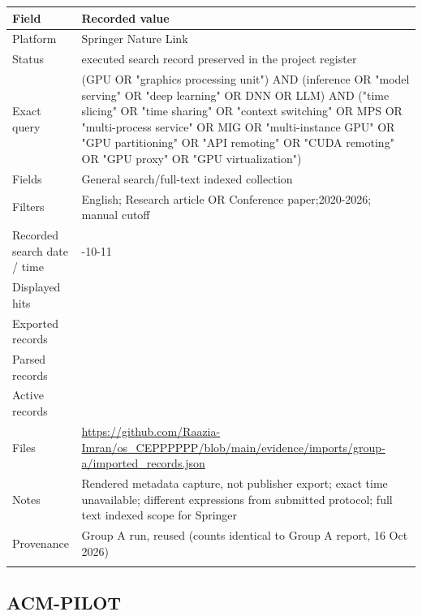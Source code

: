 \begin{longtable}{>{\raggedright\arraybackslash}p{}>{\raggedright\arraybackslash}p{}}
\toprule
\textbf{Field} & \textbf{Recorded value}\\\midrule\endhead
Platform & Springer Nature Link\\\addlinespace
Status & executed search record preserved in the project register\\\addlinespace
Exact query & (GPU OR "graphics processing unit") AND (inference OR "model serving" OR "deep learning" OR DNN OR LLM) AND ("time slicing" OR "time sharing" OR "context switching" OR MPS OR "multi-process service" OR MIG OR "multi-instance GPU" OR "GPU partitioning" OR "API remoting" OR "CUDA remoting" OR "GPU proxy" OR "GPU virtualization")\\\addlinespace
Fields & General search/full-text indexed collection\\\addlinespace
Filters & English; Research article OR Conference paper;2020-2026; manual cutoff\\\addlinespace
Recorded search date / time & 2026-10-11\\\addlinespace
Displayed hits & 587\\\addlinespace
Exported records & 587\\\addlinespace
Parsed records & 587\\\addlinespace
Active records & 587\\\addlinespace
Files & \url{https://github.com/Raazia-Imran/os_CEPPPPPP/blob/main/evidence/imports/group-a/imported_records.json}\\\addlinespace
Notes & Rendered metadata capture, not publisher export; exact time unavailable; different expressions from submitted protocol; full text indexed scope for Springer\\\addlinespace
Provenance & Group A run, reused (counts identical to Group A report, 16 Oct 2026)\\\addlinespace
\bottomrule\end{longtable}

\subsection{ACM-PILOT}

